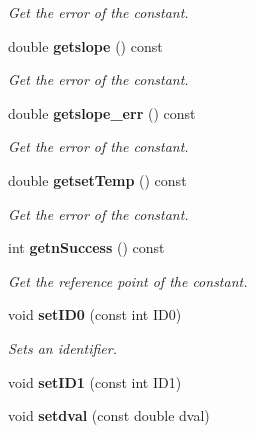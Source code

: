 \begin{DoxyCompactItemize}
\begin{DoxyCompactList}\small\item\em Get the error of the constant. \end{DoxyCompactList}\item 
double {\bf getslope} () const \label{classCALICE_1_1ScECALGainfit_acfacde2820945334b9dc3d2f71082995}

\begin{DoxyCompactList}\small\item\em Get the error of the constant. \end{DoxyCompactList}\item 
double {\bf getslope\-\_\-err} () const \label{classCALICE_1_1ScECALGainfit_a3ecd7fde37dab4825939e63bed01a64e}

\begin{DoxyCompactList}\small\item\em Get the error of the constant. \end{DoxyCompactList}\item 
double {\bf getset\-Temp} () const \label{classCALICE_1_1ScECALGainfit_a956008d4cf21859099fa90b4669b7fa0}

\begin{DoxyCompactList}\small\item\em Get the error of the constant. \end{DoxyCompactList}\item 
int {\bf getn\-Success} () const \label{classCALICE_1_1ScECALGainfit_a9174f6151eaffaa52f638593fca922f5}

\begin{DoxyCompactList}\small\item\em Get the reference point of the constant. \end{DoxyCompactList}\item 
void {\bf set\-I\-D0} (const int I\-D0)\label{classCALICE_1_1ScECALGainfit_a77d93fb1baa6a91c0377079101249849}

\begin{DoxyCompactList}\small\item\em Sets an identifier. \end{DoxyCompactList}\item 
void {\bfseries set\-I\-D1} (const int I\-D1)\label{classCALICE_1_1ScECALGainfit_a2b046a35db73f8edd6d633ba1d9327d8}

\item 
void {\bf setdval} (const double dval)\label{classCALICE_1_1ScECALGainfit_a7c858575bea67eae037fde913776f24f}


\end{DoxyCompactItemize}
